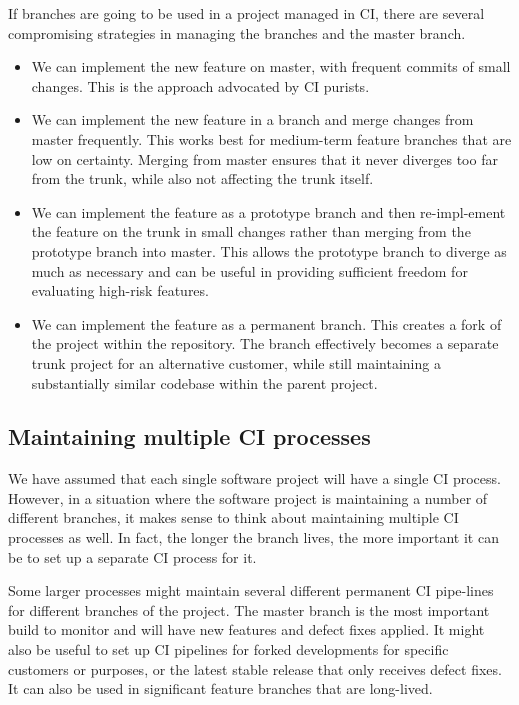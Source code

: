\documentclass[a4paper, openany]{memoir}
\begin{document}
If branches are going to be used in a project managed in CI, there are several compromising strategies in managing the branches and the master branch.
\begin{itemize}
    \item We can implement the new feature on master, with frequent commits of small changes. This is the approach advocated by CI purists.
    
    \item We can implement the new feature in a branch and merge changes from master frequently. This works best for medium-term feature branches that are low on certainty. Merging from master ensures that it never diverges too far from the trunk, while also not affecting the trunk itself.
    
    \item We can implement the feature as a prototype branch and then re-impl-ement the feature on the trunk in small changes rather than merging from the prototype branch into master. This allows the prototype branch to diverge as much as necessary and can be useful in providing sufficient freedom for evaluating high-risk features.
    
    \item We can implement the feature as a permanent branch. This creates a fork of the project within the repository. The branch effectively becomes a separate trunk project for an alternative customer, while still maintaining a substantially similar codebase within the parent project.
\end{itemize}

\subsection{Maintaining multiple CI processes}
We have assumed that each single software project will have a single CI process. However, in a situation where the software project is maintaining a number of different branches, it makes sense to think about maintaining multiple CI processes as well. In fact, the longer the branch lives, the more important it can be to set up a separate CI process for it.

Some larger processes might maintain several different permanent CI pipe-lines for different branches of the project. The master branch is the most important build to monitor and will have new features and defect fixes applied. It might also be useful to set up CI pipelines for forked developments for specific customers or purposes, or the latest stable release that only receives defect fixes. It can also be used in significant feature branches that are long-lived.
\end{document}
